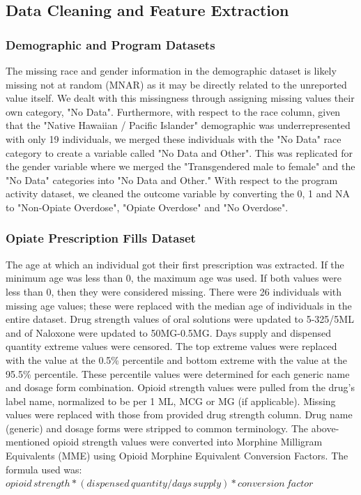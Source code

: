 \documentclass[twoside,10.5pt]{article}
\let\footnote=\endnote
\begin{document}
\subsection{Data Cleaning and Feature Extraction}
\subsubsection{Demographic and Program Datasets}
The missing race and gender information in the demographic dataset is likely missing not at random (MNAR) as it may be directly related to the unreported value itself. We dealt with this missingness through assigning missing values their own category, "No Data". Furthermore, with respect to the race column, given that the "Native Hawaiian / Pacific Islander" demographic was underrepresented with only 19 individuals, we merged these individuals with the "No Data" race category to create a variable called "No Data and Other". This was replicated for the gender variable where we merged the "Transgendered male to female" and the "No Data" categories into "No Data and Other." With respect to the program activity dataset, we cleaned the outcome variable by converting the 0, 1 and NA to "Non-Opiate Overdose", "Opiate Overdose" and "No Overdose". 

\subsubsection{Opiate Prescription Fills Dataset}
The age at which an individual got their first prescription was extracted. If the minimum age was less than 0, the maximum age was used. If both values were less than 0, then they were considered missing. There were 26 individuals with missing age values; these were replaced with the median age of individuals in the entire dataset. Drug strength values of oral solutions were updated to 5-325/5ML and of Naloxone were updated to 50MG-0.5MG. Days supply and dispensed quantity extreme values were censored. The top extreme values were replaced with the value at the 0.5\% percentile and bottom extreme with the value at the 95.5\% percentile. These percentile values were determined for each generic name and dosage form combination. Opioid strength values were pulled from the drug's label name, normalized to be per 1 ML, MCG or MG (if applicable). Missing values were replaced with those from provided drug strength column. Drug name (generic) and dosage forms were stripped to common terminology. The above-mentioned opioid strength values were converted into Morphine Milligram Equivalents (MME) using Opioid Morphine Equivalent Conversion Factors\footnote{\cite{CMS}}. The formula used was: 
$opioid\,strength * (dispensed\,quantity / days\,supply) * conversion\,factor$
\end{document}
